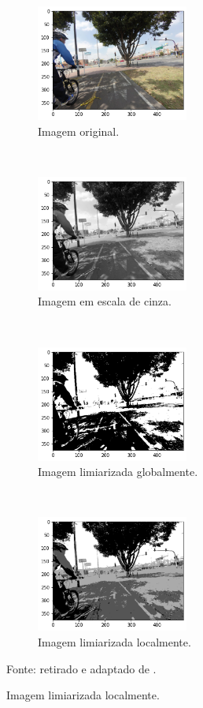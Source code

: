 \begin{figure}[H]
   \caption{Limiarizações.}
   \centering
   \label{segment:fig:3}
    \begin{subfigure}[t]{0.45\textwidth}
        \centering
        \includegraphics[height=1.5in]{recursos/imagens/image_seg/mapi.png}
        \caption{Imagem original.}
        \label{segment:fig:3.1}
    \end{subfigure}%
    ~ 
    \begin{subfigure}[t]{0.45\textwidth}
        \centering
        \includegraphics[height=1.5in]{recursos/imagens/image_seg/gray_mapi.png}
        \caption{Imagem em escala de cinza.}
        \label{segment:fig:3.2}
    \end{subfigure}%
    ~ 
    
    \begin{subfigure}[t]{0.45\textwidth}
        \centering
        \includegraphics[height=1.5in]{recursos/imagens/image_seg/bw_mapi.png}
        \caption{Imagem limiarizada globalmente.}
        \label{segment:fig:3.3}
    \end{subfigure}
    ~
    \begin{subfigure}[t]{0.45\textwidth}
        \centering
        \includegraphics[height=1.5in]{recursos/imagens/image_seg/local_mapi.png}
        \caption{Imagem limiarizada localmente.}
        \label{segment:fig:3.4}
    \end{subfigure}

    \vspace*{1 cm}
    Fonte: retirado e adaptado de \cite{Neuhold2017_ICCV}.
\end{figure}

